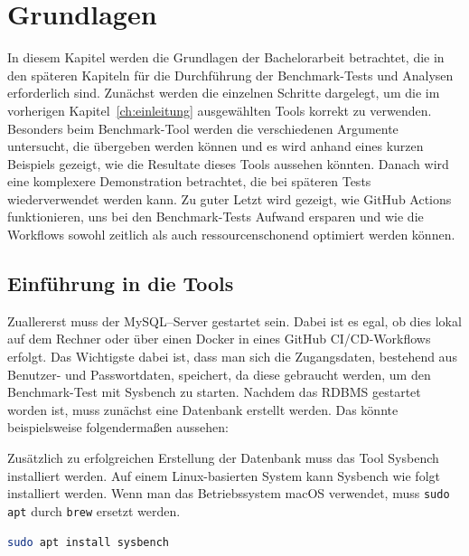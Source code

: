 \chapter{Grundlagen}\label{ch:grundlagen}

In diesem Kapitel werden die Grundlagen der Bachelorarbeit betrachtet, die in den späteren Kapiteln für die Durchführung der Benchmark-Tests und Analysen erforderlich sind.
Zunächst werden die einzelnen Schritte dargelegt, um die im vorherigen Kapitel~\ref{ch:einleitung} ausgewählten Tools korrekt zu verwenden.
Besonders beim Benchmark-Tool werden die verschiedenen Argumente untersucht, die übergeben werden können und es wird anhand eines kurzen Beispiels gezeigt, wie die Resultate dieses Tools aussehen könnten.
Danach wird eine komplexere Demonstration betrachtet, die bei späteren Tests wiederverwendet werden kann.
Zu guter Letzt wird gezeigt, wie GitHub Actions funktionieren, uns bei den Benchmark-Tests Aufwand ersparen und wie die Workflows sowohl zeitlich als auch ressourcenschonend optimiert werden können.

\section{Einführung in die Tools}\label{sec:einfuhrung-in-die-tools}

Zuallererst muss der MySQL–Server gestartet sein.
Dabei ist es egal, ob dies lokal auf dem Rechner oder über einen Docker in eines GitHub CI/CD-Workflows erfolgt.
Das Wichtigste dabei ist, dass man sich die Zugangsdaten, bestehend aus Benutzer- und Passwortdaten, speichert, da diese gebraucht werden, um den Benchmark-Test mit Sysbench zu starten.
Nachdem das RDBMS gestartet worden ist, muss zunächst eine Datenbank erstellt werden.
Das könnte beispielsweise folgendermaßen aussehen:

\vspace{-5pt}

\vspace{-9pt}

Zusätzlich zu erfolgreichen Erstellung der Datenbank muss das Tool Sysbench installiert werden.
Auf einem Linux-basierten System kann Sysbench wie folgt installiert werden.
Wenn man das Betriebssystem macOS verwendet, muss \texttt{sudo apt} durch \texttt{brew} ersetzt werden.

\vspace{-5pt}
\begin{lstlisting}[language=bash]
sudo apt install sysbench
\end{lstlisting}
\vspace{-9pt}

